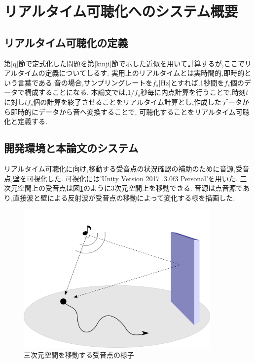 \documentclass[dvipdfmx]{ampbt}
\begin{document}
\section{リアルタイム可聴化へのシステム概要}
\subsection{リアルタイム可聴化の定義}
第\ref{q}節で定式化した問題を第\ref{kinji}節で示した近似を用いて計算するが,ここでリアルタイムの定義についてしるす.
実用上のリアルタイムとは実時間的,即時的という言葉である.音の場合,サンプリングレートを$f_s$[Hz]とすれば,1秒間を$f_s$個のデータで構成することになる.
本論文では,$1/f_s$秒毎に内点計算を行うことで,時刻$t$に対し$tf_s$個の計算を終了させることをリアルタイム計算とし,作成したデータから即時的にデータから音へ変換することで,
可聴化することをリアルタイム可聴化と定義する.


\subsection{開発環境と本論文のシステム}
リアルタイム可聴化に向け,移動する受音点の状況確認の補助のために音源,受音点,壁を可視化した.
可視化には'Unity Version 2017 .3.0f3 Personal'を用いた.
三次元空間上の受音点は図\ref{fig:move_naiten}のように3次元空間上を移動できる.
音源は点音源であり,直接波と壁による反射波が受音点の移動によって変化する様を描画した.
\begin{figure}[H]
  \begin{center}
    \includegraphics[clip,width=10.0cm]{./png/move_naiten.png}
    \caption{三次元空間を移動する受音点の様子}
    \label{fig:move_naiten}
  \end{center}
\end{figure}\\
\end{document}
